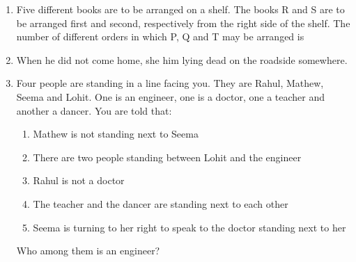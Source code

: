 \documentclass[a4paper, 11pt]{article}
\begin{document}
\begin{enumerate}
    \item Five different books  are to be arranged on a shelf. The books R and S are to be arranged first and second, respectively from the right side of the shelf. The number of different orders in which P, Q and T may be arranged is
    \begin{enumerate}
    \end{enumerate}
    \hfill{}

    \item When he did not come home, she \underline{\hspace{2cm}} him lying dead on the roadside somewhere.
    \begin{enumerate}
    \end{enumerate}
    \hfill{}

    \item Four people are standing in a line facing you. They are Rahul, Mathew, Seema and Lohit. One is an engineer, one is a doctor, one a teacher and another a dancer. You are told that:
    \begin{enumerate}[label=\arabic*.]
        \item Mathew is not standing next to Seema
        \item There are two people standing between Lohit and the engineer
        \item Rahul is not a doctor
        \item The teacher and the dancer are standing next to each other
        \item Seema is turning to her right to speak to the doctor standing next to her
    \end{enumerate}
    Who among them is an engineer?
    \begin{enumerate}
    \end{enumerate}
    \hfill{}


\end{enumerate}
\end{document}

